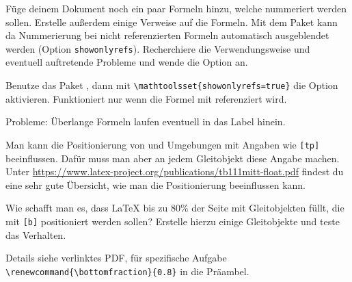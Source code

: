 \begin{uebung}
        \item Füge deinem Dokument noch ein paar Formeln hinzu, welche nummeriert werden
            sollen. Erstelle außerdem einige Verweise auf die Formeln. Mit dem Paket
             kann da Nummerierung bei nicht referenzierten Formeln
            automatisch ausgeblendet werden (Option \verb|showonlyrefs|). Recherchiere
            die Verwendungsweise und eventuell auftretende Probleme und wende die Option an.
            \begin{loesung}
            	Benutze das Paket , dann mit
            	\verb|\mathtoolsset{showonlyrefs=true}| die Option aktivieren.
            	Funktioniert nur wenn die Formel mit  referenziert wird.
            	
            	Probleme: Überlange Formeln laufen eventuell in das Label hinein.
            \end{loesung}

        \item Man kann die Positionierung von  und  Umgebungen mit
            Angaben wie \verb|[tp]| beeinflussen. Dafür muss man aber an jedem Gleitobjekt
            diese Angabe machen. Unter
            \url{https://www.latex-project.org/publications/tb111mitt-float.pdf}
            findest du eine sehr gute Übersicht, wie man die Positionierung beeinflussen kann.

            Wie schafft man es, dass \LaTeX{} bis zu 80\%{} der Seite mit Gleitobjekten füllt,
            die mit \verb|[b]| positioniert werden sollen?
            Erstelle hierzu einige Gleitobjekte und teste das Verhalten.
            \begin{loesung}
            	Details siehe verlinktes PDF, für spezifische Aufgabe\\
            	\verb|\renewcommand{\bottomfraction}{0.8}| in die Präambel.
            \end{loesung}
    \end{uebung}
